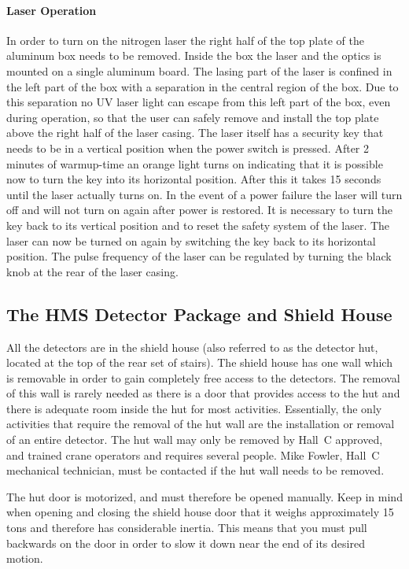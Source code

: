 \paragraph{Laser Operation} 
In order to turn on the nitrogen laser the right half of the top
plate of the aluminum box needs to be removed. Inside the box 
the laser and the optics is mounted on a single aluminum board.
The lasing part of the laser is confined in the left part of the box
with a separation in the central region of the box. Due to this separation
no UV laser light can escape from this left part of the box,
even during operation, so that the user can safely remove and install the
top plate above the right half of the laser casing.
The laser itself has a security key that needs 
to be in a vertical position when the power switch is pressed. After
2 minutes of warmup-time an orange light turns on indicating that
it is possible now to turn the key into its horizontal position.
After this it takes 15 seconds until the laser actually turns on.
In the event of a power failure the laser will turn off and will not
turn on again after power is restored. It is necessary to turn the key
back to its vertical position and to reset the safety system of the laser.
The laser can now be turned on again by switching the key back to its
horizontal position. The pulse frequency of the laser can be regulated by
turning the black knob at the rear of the laser casing.

\subsection{The HMS Detector Package and Shield House }

All the detectors are in the shield house (also referred to as the detector hut,
located at the top of the
rear set of stairs). The shield house has one wall which is removable
in order to gain completely free access to the detectors. The removal
of this wall is rarely needed as there is a door that provides access
to the hut and there is adequate room inside the hut for most activities.
Essentially, the only activities that require the removal of the hut
wall are the installation or removal of an entire detector. The
hut wall may only be removed by Hall~C approved, and trained crane
operators and requires
several people. Mike Fowler, Hall~C mechanical technician,  
must be contacted if the hut wall needs to be removed.

The hut door is motorized, and must therefore be opened manually. Keep in mind when opening and closing the
shield house door that it weighs approximately 15 tons and therefore has
considerable inertia. This means that you must pull backwards on the door
in order to slow it down near the end of its desired motion.

